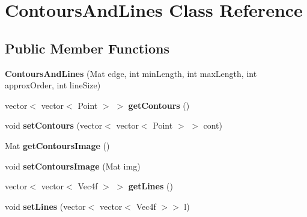 \hypertarget{classContoursAndLines}{
\section{ContoursAndLines Class Reference}
\label{classContoursAndLines}
}
\subsection*{Public Member Functions}
\begin{DoxyCompactItemize}
\item 
\hypertarget{classContoursAndLines_a852f13ca6a3e3ec9034db16e51629cdc}{
{\bfseries ContoursAndLines} (Mat edge, int minLength, int maxLength, int approxOrder, int lineSize)}
\label{classContoursAndLines_a852f13ca6a3e3ec9034db16e51629cdc}

\item 
\hypertarget{classContoursAndLines_a9856f1b866243c3230011a3c57ba1f8a}{
vector$<$ vector$<$ Point $>$ $>$ {\bfseries getContours} ()}
\label{classContoursAndLines_a9856f1b866243c3230011a3c57ba1f8a}

\item 
\hypertarget{classContoursAndLines_a7b8d19a71f89583401c9933fecb2fca5}{
void {\bfseries setContours} (vector$<$ vector$<$ Point $>$ $>$ cont)}
\label{classContoursAndLines_a7b8d19a71f89583401c9933fecb2fca5}

\item 
\hypertarget{classContoursAndLines_a58cc2d49afa467805b3798ac15d21aab}{
Mat {\bfseries getContoursImage} ()}
\label{classContoursAndLines_a58cc2d49afa467805b3798ac15d21aab}

\item 
\hypertarget{classContoursAndLines_a35aa427298b3b6cb296c9881b191ee79}{
void {\bfseries setContoursImage} (Mat img)}
\label{classContoursAndLines_a35aa427298b3b6cb296c9881b191ee79}

\item 
\hypertarget{classContoursAndLines_a50c228e4855daf69218517b84e04c859}{
vector$<$ vector$<$ Vec4f $>$ $>$ {\bfseries getLines} ()}
\label{classContoursAndLines_a50c228e4855daf69218517b84e04c859}

\item 
\hypertarget{classContoursAndLines_af8f81452b7e24bbabb4ae7657caffd4a}{
void {\bfseries setLines} (vector$<$ vector$<$ Vec4f $>$$>$ l)}
\label{classContoursAndLines_af8f81452b7e24bbabb4ae7657caffd4a}


\end{DoxyCompactItemize}
